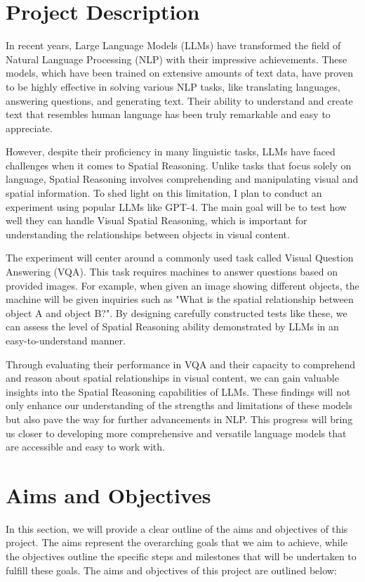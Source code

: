\documentclass[journal,10pt]{IEEEtran}
\begin{document}

\section{Project Description}
In recent years, Large Language Models (LLMs) have transformed the field of Natural Language Processing (NLP) with their impressive achievements. These models, which have been trained on extensive amounts of text data, have proven to be highly effective in solving various NLP tasks, like translating languages, answering questions, and generating text. Their ability to understand and create text that resembles human language has been truly remarkable and easy to appreciate.

However, despite their proficiency in many linguistic tasks, LLMs have faced challenges when it comes to Spatial Reasoning. Unlike tasks that focus solely on language, Spatial Reasoning involves comprehending and manipulating visual and spatial information. To shed light on this limitation, I plan to conduct an experiment using popular LLMs like GPT-4\cite{peng2023instruction}. The main goal will be to test how well they can handle Visual Spatial Reasoning, which is important for understanding the relationships between objects in visual content.

The experiment will center around a commonly used task called Visual Question Answering (VQA). This task requires machines to answer questions based on provided images. For example, when given an image showing different objects, the machine will be given inquiries such as "What is the spatial relationship between object A and object B?". By designing carefully constructed tests like these, we can assess the level of Spatial Reasoning ability demonstrated by LLMs in an easy-to-understand manner.

Through evaluating their performance in VQA and their capacity to comprehend and reason about spatial relationships in visual content, we can gain valuable insights into the Spatial Reasoning capabilities of LLMs. These findings will not only enhance our understanding of the strengths and limitations of these models but also pave the way for further advancements in NLP. This progress will bring us closer to developing more comprehensive and versatile language models that are accessible and easy to work with.

\section{Aims and Objectives}
In this section, we will provide a clear outline of the aims and objectives of this project. The aims represent the overarching goals that we aim to achieve, while the objectives outline the specific steps and milestones that will be undertaken to fulfill these goals. The aims and objectives of this project are outlined below:
\end{document}
